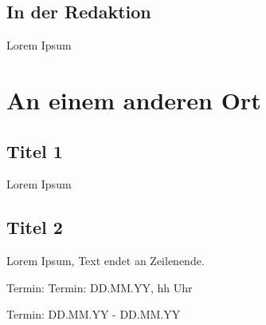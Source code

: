 \documentclass[final]{multiversum}
\begin{document}
\subsection{In der Redaktion}
Lorem Ipsum

\section{An einem anderen Ort}

\subsection{Titel 1}
Lorem Ipsum

\subsection{Titel 2}
Lorem Ipsum, Text endet an Zeilenende.


\begin{termine}
\item Termin: Termin: DD.MM.YY, hh Uhr
  \item Termin: DD.MM.YY - DD.MM.YY
\end{termine}
\impressum
\end{document}

